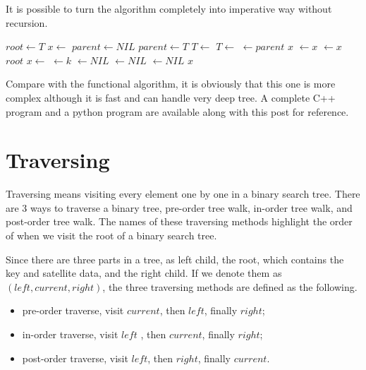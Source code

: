 \documentclass{article}
\begin{document}
It is possible to turn the algorithm completely into imperative way
without recursion.

\begin{algorithmic}[1]
  \State $root \gets T$
  \State $x \gets$ 
  \State $parent \gets NIL$
    \State $parent \gets T$
      \State $T \gets $ 
    \Else
      \State $T \gets $ 
    \EndIf
  \EndWhile
  \State {} $\gets parent$
   
    \State \Return $x$
    \State {} $\gets x$
  \Else
    \State {} $\gets x$
  \EndIf
  \State \Return $root$
\EndFunction
\Statex
{}
  \State $x \gets $ 
  \State {} $ \gets k$
  \State {} $ \gets NIL$
  \State {} $ \gets NIL$
  \State {} $ \gets NIL$
  \State \Return $x$
\EndFunction
\end{algorithmic}

Compare with the functional algorithm, it is obviously that this one
is more complex although it is fast and can handle very deep tree. A
complete C++ program and a python program are available along with this
post for reference.

\section{Traversing}

Traversing means visiting every element one by one in a binary
search tree. There are 3 ways to traverse a binary tree, pre-order tree walk,
in-order tree walk, and post-order tree walk. The names of these
traversing methods highlight the order of when we visit the root
of a binary search tree.

Since there are three parts in a tree, as left child, the root, which
contains the key and satellite data, and the right child. If we denote
them as $(left, current, right)$, the three traversing methods are defined
as the following.

\begin{itemize}
\item pre-order traverse, visit $current$, then $left$, finally $right$;
\item in-order traverse, visit $left$ , then $current$, finally $right$;
\item post-order traverse, visit $left$, then $right$, finally $current$.
\end{itemize}
\end{document}
